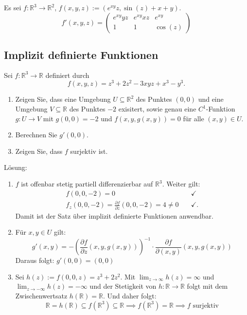 \documentclass[parskip=full]{scrartcl}
\begin{document}
Es sei $f : \mathbb{R}^3 \to \mathbb{R}^2$, $f(x,y,z) := (e^{xy}z, \sin(z) + x + y)$.
\begin{displaymath}
  f'(x,y,z) =
  \begin{pmatrix}
    e^{xy}yz & e^{xy}xz & e^{xy}\\
    1 & 1 & \cos(z)
  \end{pmatrix}
\end{displaymath}

\subsection{Implizit definierte Funktionen}
Sei $f : \mathbb{R}^3 \to \mathbb{R}$ definiert durch
\begin{displaymath}
  f(x,y,z) = z^3 + 2z^2 - 3xyz + x^3 - y^3.
\end{displaymath}
\begin{enumerate}
    \item Zeigen Sie, dass eine Umgebung $U \subseteq \mathbb{R}^2$ des Punktes $(0,0)$ und eine Umgebung $V \subseteq \mathbb{R}$ des Punktes $-2$ exisitert, sowie genau eine $C^1$-Funktion $g : U \to V$ mit $g(0,0) = -2$ und $f(x,y,g(x,y)) = 0$ für alle $(x,y) \in U$.
    \item Berechnen Sie $g'(0,0)$.
    \item Zeigen Sie, dass $f$ surjektiv ist.
\end{enumerate}
Lösung:
\begin{enumerate}
    \item $f$ ist offenbar stetig partiell differenzierbar auf $\mathbb{R}^3$.
    Weiter gilt:
    \begin{align*}
      f(0,0,-2) = 0 &\quad \checkmark\\
      f_z(0,0,-2) = \frac{\partial f}{\partial z} (0,0,-2) = 4 \neq 0 &\quad \checkmark.
    \end{align*}
    Damit ist der Satz über implizit definierte Funktionen anwendbar.
    \item Für $x,y \in U$ gilt:
    \begin{displaymath}
      g'(x,y) = -\left(\frac{\partial f}{\partial z} (x,y,g(x,y))\right)^{-1} \cdot \frac{\partial f}{\partial (x,y)} (x,y,g(x,y))
    \end{displaymath}
    Daraus folgt: $g'(0,0) = (0,0)$
    \item Sei $h(z) := f(0,0,z) = z^3 + 2z^2$. Mit $\lim_{z \to \infty} h(z) = \infty$ und $\lim_{z \to -\infty} h(z) = -\infty$ und der Stetigkeit von $h : \mathbb{R} \to \mathbb{R}$ folgt mit dem Zwischenwertsatz $h(\mathbb{R}) = \mathbb{R}$.
    Und daher folgt:
    \begin{displaymath}
      \mathbb{R} = h(\mathbb{R}) \subseteq f(\mathbb{R}^3) \subseteq \mathbb{R} \implies f(\mathbb{R}^3) = \mathbb{R} \implies f \text{ surjektiv}
    \end{displaymath}
\end{enumerate}
\end{document}
